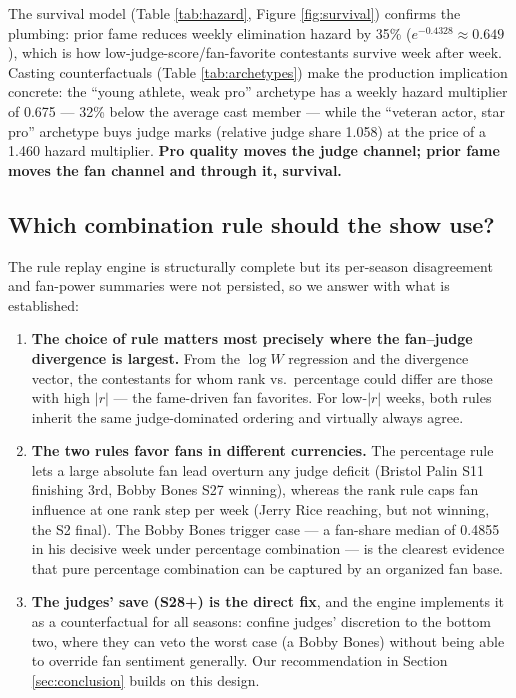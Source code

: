 The survival model (Table \ref{tab:hazard}, Figure \ref{fig:survival}) confirms the
plumbing: prior fame reduces weekly elimination hazard by 35\%
($e^{-0.4328} \approx 0.649$), which is how low-judge-score/fan-favorite contestants
survive week after week. Casting counterfactuals (Table
\ref{tab:archetypes}) make the production implication concrete: the
``young athlete, weak pro'' archetype has a weekly hazard multiplier of 0.675 ---
32\% below the average cast member --- while the ``veteran actor, star pro''
archetype buys judge marks (relative judge share 1.058) at the price of a 1.460
hazard multiplier. \textbf{Pro quality moves the judge channel; prior fame moves the
fan channel and through it, survival.}

\subsection{Which combination rule should the show use?}

The rule replay engine is structurally complete but its per-season disagreement and
fan-power summaries were not persisted, so we answer with what is established:
\begin{enumerate}
\item \textbf{The choice of rule matters most precisely where the fan--judge
divergence is largest.} From the $\log W$ regression and the divergence vector, the
contestants for whom rank vs.\ percentage could differ are those with high $|r|$ ---
the fame-driven fan favorites. For low-$|r|$ weeks, both rules inherit the same
judge-dominated ordering and virtually always agree.
\item \textbf{The two rules favor fans in different currencies.} The percentage
rule lets a large absolute fan lead overturn any judge deficit (Bristol Palin S11
finishing 3rd, Bobby Bones S27 winning), whereas the rank rule caps fan influence at
one rank step per week (Jerry Rice reaching, but not winning, the S2 final). The
Bobby Bones trigger case --- a fan-share median of 0.4855 in his decisive week under
percentage combination --- is the clearest evidence that pure percentage combination
can be captured by an organized fan base.
\item \textbf{The judges' save (S28+) is the direct fix}, and the engine implements
it as a counterfactual for all seasons: confine judges' discretion to the bottom two,
where they can veto the worst case (a Bobby Bones) without being able to override
fan sentiment generally. Our recommendation in Section \ref{sec:conclusion} builds on
this design.
\end{enumerate}

